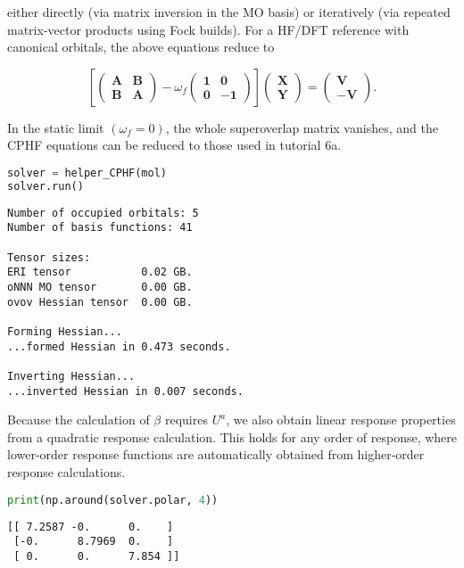 \documentclass[]{article}
\begin{document}
either directly (via matrix inversion in the MO basis) or iteratively
(via repeated matrix-vector products using Fock builds). For a HF/DFT
reference with canonical orbitals, the above equations reduce to

\[
\left[
\begin{pmatrix}
\mathbf{A} & \mathbf{B} \\
\mathbf{B} & \mathbf{A}
\end{pmatrix}
- \omega_{f}
\begin{pmatrix}
\mathbf{1} & \mathbf{0} \\
\mathbf{0} & -\mathbf{1}
\end{pmatrix}
\right]
\begin{pmatrix}
\mathbf{X} \\
\mathbf{Y}
\end{pmatrix}
=
\begin{pmatrix}
\mathbf{V} \\
-\mathbf{V}
\end{pmatrix}
.
\]

In the static limit \((\omega_f = 0)\), the whole superoverlap matrix
vanishes, and the CPHF equations can be reduced to those used in
tutorial 6a.

\begin{lstlisting}[language=Python]
solver = helper_CPHF(mol)
solver.run()
\end{lstlisting}

\begin{lstlisting}
Number of occupied orbitals: 5
Number of basis functions: 41

Tensor sizes:
ERI tensor           0.02 GB.
oNNN MO tensor       0.00 GB.
ovov Hessian tensor  0.00 GB.

Forming Hessian...
...formed Hessian in 0.473 seconds.

Inverting Hessian...
...inverted Hessian in 0.007 seconds.
\end{lstlisting}

Because the calculation of \(\beta\) requires \(U^{a}\), we also obtain
linear response properties from a quadratic response calculation. This
holds for any order of response, where lower-order response functions
are automatically obtained from higher-order response calculations.

\begin{lstlisting}[language=Python]
print(np.around(solver.polar, 4))
\end{lstlisting}

\begin{lstlisting}
[[ 7.2587 -0.      0.    ]
 [-0.      8.7969  0.    ]
 [ 0.      0.      7.854 ]]
\end{lstlisting}
\end{document}
